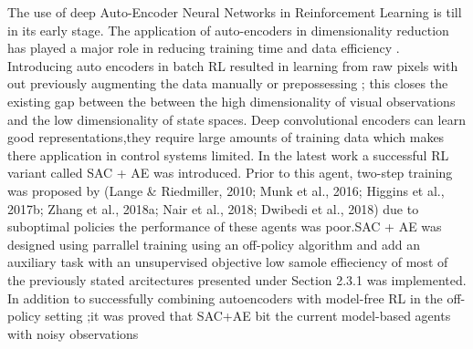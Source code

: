 The use of deep Auto-Encoder Neural Networks in Reinforcement Learning is till
in its early stage. The application of auto-encoders in dimensionality reduction
has played a major role in reducing training time and data efficiency
\cite{auto-encoderforEfficientEmbeddedReinforcementLearning}.
Introducing auto encoders in batch RL resulted in learning from 
raw pixels with out previously augmenting the data manually or 
prepossessing \cite{firstaeinrl}; this closes the  
existing gap between the  between the high dimensionality of 
visual observations and the low dimensionality of state spaces.
Deep
convolutional encoders can learn good representations,they require large
amounts of training data which makes  there application  in control systems
limited.
In the latest work \cite{sac} a successful RL variant called SAC + AE was
introduced. Prior to this agent, two-step training was proposed by (Lange \&
Riedmiller, 2010; Munk et al., 2016; Higgins et al., 2017b; Zhang et al.,
2018a; Nair et al., 2018; Dwibedi et al., 2018) due to suboptimal policies the
performance of these agents was poor.SAC + AE was designed using parrallel
training using an off-policy algorithm and add an auxiliary task with an
unsupervised objective low samole effieciency of most of the previously stated
arcitectures presented under Section 2.3.1 was implemented. In addition to
successfully combining autoencoders with model-free RL in the off-policy
setting ;it was proved that SAC+AE bit the current model-based agents  with
noisy observations  


%
%
%
%


